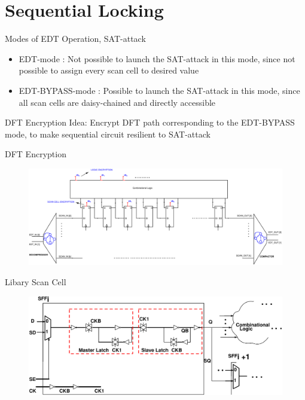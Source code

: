 \section{Sequential Locking}
\begin{frame}{Modes of EDT Operation, SAT-attack}
\begin{itemize}
	\item EDT-mode : Not possible to launch the SAT-attack in this mode, since not possible to assign every scan cell to desired value 
	\item EDT-BYPASS-mode : Possible to launch the SAT-attack in this mode, since all scan cells are daisy-chained and directly accessible
\end{itemize}
\end{frame}

\begin{frame}{DFT Encryption}
\alert{Idea:} Encrypt DFT path corresponding to the EDT-BYPASS mode, to make sequential circuit resilient to SAT-attack
\end{frame}

\begin{frame}{DFT Encryption}
\begin{figure}
\begin{center}
\label{fig:encrypted-dft}
\includegraphics[scale=0.2]{fig/encrypted-DFT.pdf}
\end{center}
\end{figure}
\end{frame}

\begin{frame}{Libary Scan Cell}
\begin{figure}
\begin{center}
\label{fig:sc}
\includegraphics[scale=0.2]{fig/traditional-scanflop.pdf}
\end{center}
\end{figure}
\end{frame}

